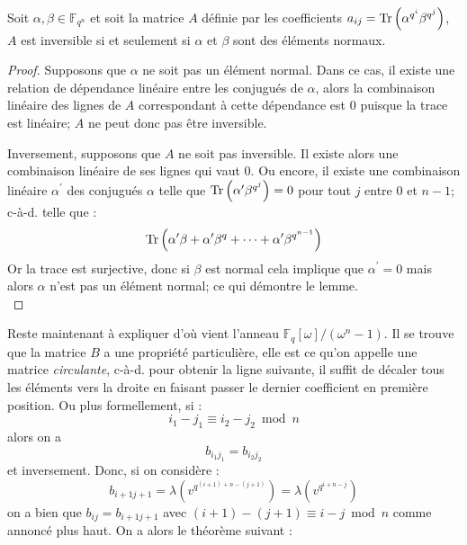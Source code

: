 \documentclass[a4paper]{article} %
\numberwithin{section}{part}
\numberwithin{equation}{section}
\newcommand\GF[1]{\mathbb{F}_{#1}}
\newcommand\Tr[1]{\textup{Tr}\left(#1\right)}
\begin{document}
\begin{lem}
\label{lem:mattrinv}
Soit $\alpha,\beta\in\GF{q^n}$ et soit la matrice $A$ définie par les 
coefficients $a_{ij} = \Tr{\alpha^{q^i}\beta^{q^j}}$, $A$ est inversible si et 
seulement si $\alpha$ et $\beta$ sont des éléments normaux.
\end{lem}
\begin{proof}
Supposons que $\alpha$ ne soit pas un élément normal. Dans ce cas, il existe une
relation de dépendance linéaire entre les conjugués de $\alpha$, alors la 
combinaison linéaire des lignes de $A$ correspondant à cette dépendance est $0$
puisque la trace est linéaire; $A$ ne peut donc pas être inversible.\par
Inversement, supposons que $A$ ne soit pas inversible. Il existe alors une 
combinaison linéaire de ses lignes qui vaut $0$. Ou encore, il existe une 
combinaison linéaire $\alpha^{\prime}$ des conjugués $\alpha$ telle que 
$\Tr{\alpha^{\prime}\beta^{q^j}} = 0$ pour tout $j$ entre $0$ et $n-1$; 
c-à-d. telle que :
\[\Tr{\alpha^{\prime}\beta + \alpha^{\prime}\beta^q + \dots + 
\alpha^{\prime}\beta^{q^{n-1}}}\]
Or la trace est surjective, donc si $\beta$ est normal cela implique que 
$\alpha^{\prime} = 0$ mais alors $\alpha$ n'est pas un élément normal; ce qui 
démontre le lemme.\\
\end{proof}
Reste maintenant à expliquer d'où vient l'anneau 
$\mathbb{F}_q[\omega]/(\omega^n - 1)$. Il se trouve que la matrice $B$ a une 
propriété particulière, elle est ce qu'on appelle une matrice \emph{circulante},
c-à-d. pour obtenir la ligne suivante, il suffit de décaler tous les 
éléments vers la droite en faisant passer le dernier coefficient en première 
position. Ou plus formellement, si :
\[i_1 - j_1 \equiv i_2 - j_2 \bmod n\]
alors on a 
\[b_{i_1j_1} = b_{i_2j_2}\]
et inversement. Donc, si on considère :
\[b_{i+1j+1} = \lambda\left(v^{q^{(i+1) + n - (j+1)}}\right) = 
\lambda\left(v^{q^{i+n-j}}\right)\]
on a bien que $b_{ij} = b_{i+1j+1}$ avec $(i+1) - (j+1) \equiv i - j \bmod n$ 
comme annoncé plus haut. On a alors le théorème suivant :
\end{document}
